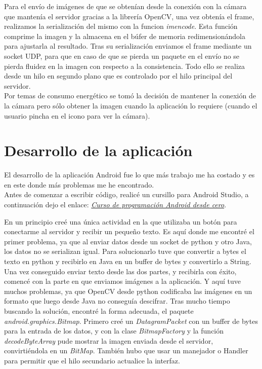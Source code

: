 
Para el envío de imágenes de que se obtenían desde la conexión con la cámara que mantenía el servidor gracias a la librería OpenCV, una vez obtenía el frame, realizamos la serialización del mismo con la funcion \textit{imencode}.
Esta función comprime la imagen y la almacena en el búfer de memoria redimensionándola para ajustarla al resultado.
Tras su serialización enviamos el frame mediante un socket UDP, para que en caso de que se pierda un paquete en el envío no se pierda fluidez en la imagen con respecto a la consistencia. Todo ello se realiza desde un hilo en segundo plano que es controlado por el hilo principal del servidor.\\
Por temas de consumo energético se tomó la decisión de mantener la conexión de la cámara pero sólo obtener la imagen cuando la aplicación lo requiere (cuando el usuario pincha en el icono para ver la cámara).



\section{Desarrollo de la aplicación}
El desarrollo de la aplicación Android fue lo que más trabajo me ha costado y es en este donde más problemas me he encontrado.\\

Antes de comenzar a escribir código, realicé un cursillo para Android Studio, a continuación dejo el enlace: \href{https://www.youtube.com/watch?v=tyx05coXixw&list=PLyvsggKtwbLX06iMtXnRGX5lyjiiMaT2y}{\textit{Curso de programación Android desde cero}}.


En un principio creé una única actividad en la que utilizaba un botón para conectarme al servidor y recibir un pequeño texto. 
Es aquí donde me encontré el primer problema, ya que al enviar datos desde un socket de python y otro Java, los datos no se serializan igual. Para solucionarlo tuve que convertir a bytes el texto en python y recibirlo en Java en un buffer de bytes y convertirlo a String.\\

Una vez conseguido enviar texto desde las dos partes, y recibirla con éxito, comencé con la parte en que enviamos imágenes a la aplicación. 
Y aquí tuve muchos problemas, ya que OpenCV desde python codificaba las imágenes en un formato que luego desde Java no conseguía descifrar. 
Tras mucho tiempo buscando la solución, encontré la forma adecuada, el paquete \textit{android.graphics.Bitmap}.
Primero creé un \textit{DatagramPacket} con un buffer de bytes para la entrada de los datos, y con la clase \textit{BitmapFactory} y la función \textit{decodeByteArray} pude mostrar la imagen enviada desde el servidor, convirtiéndola en un \textit{BitMap}. 
También hubo que usar un manejador o Handler para permitir que el hilo secundario actualice la interfaz.\\

